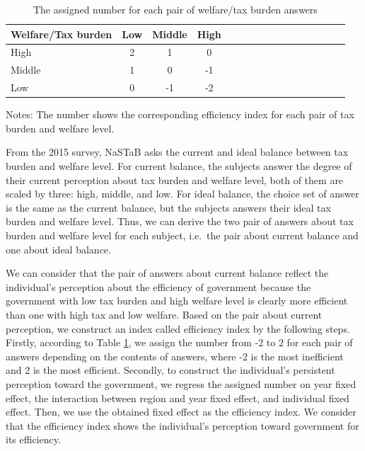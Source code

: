 \documentclass[
  11pt,
  a4paper,
]{article}
\begin{document}
  \begin{table}

  \caption{\label{tab:efficientQ}The assigned number for each pair of welfare/tax burden answers}
  \centering
  \fontsize{8}{10}\selectfont
  \begin{threeparttable}
  \begin{tabular}[t]{l|cccl|cccl|cccl|ccc}
  \toprule
  Welfare/Tax burden & Low & Middle & High\\
  \midrule
  High & 2 & 1 & 0\\
  Middle & 1 & 0 & -1\\
  Low & 0 & -1 & -2\\
  \bottomrule
  \end{tabular}
  \begin{tablenotes}
  \item Notes: The number shows the corresponding efficiency index for each pair of tax burden and welfare level.
  \end{tablenotes}
  \end{threeparttable}
  \end{table}

  From the 2015 survey, NaSTaB asks the current and ideal balance between tax burden and welfare level.
  For current balance, the subjects answer the degree of their current perception about tax burden and welfare level,
  both of them are scaled by three: high, middle, and low.
  For ideal balance, the choice set of answer is the same as the current balance, but the subjects answers their ideal tax burden and welfare level.
  Thus, we can derive the two pair of answers about tax burden and welfare level for each subject, i.e.~the pair about current balance and one about ideal balance.

  We can consider that the pair of answers about current balance reflect the individual's perception about the efficiency of government
  because the government with low tax burden and high welfare level is clearly more efficient than one with high tax and low welfare.
  Based on the pair about current perception, we construct an index called efficiency index by the following steps.
  Firstly, according to Table \ref{tab:efficientQ},
  we assign the number from -2 to 2 for each pair of answers depending on the contents of answers,
  where -2 is the most inefficient and 2 is the most efficient.
  Secondly, to construct the individual's persistent perception toward the government,
  we regress the assigned number on year fixed effect, the interaction between region and year fixed effect, and individual fixed effect.
  Then, we use the obtained fixed effect as the efficiency index.
  We consider that the efficiency index shows the individual's perception toward government for its efficiency.
\end{document}
